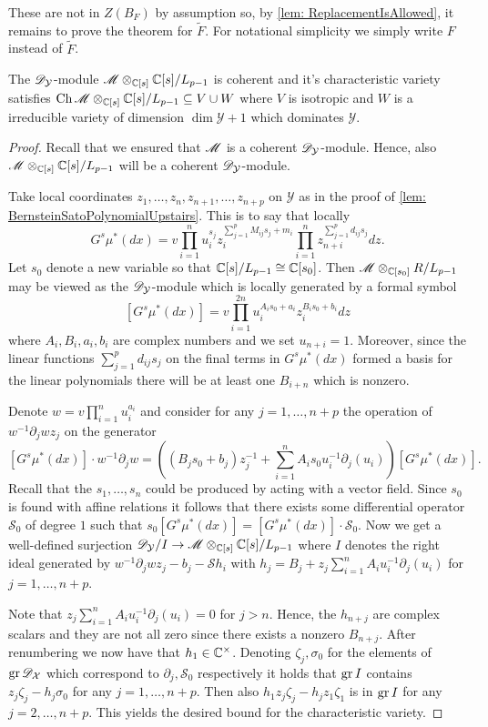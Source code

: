 These are not in $Z(B_F)$ by assumption so, by \cref{lem: ReplacementIsAllowed}, it remains to prove the theorem for $\widetilde{F}$.
For notational simplicity we simply write $F$ instead of $\widetilde{F}$.
\begin{lemma}\label{lem: CharVarEstimateW}
  The $\mathscr{D}_\mathcal{Y}$-module $\mathscr{M}\otimes_{\mathbb{C}[s]}\mathbb{C}[s]/L_{p-1}$ is coherent and it's characteristic variety satisfies $\operatorname{Ch}\mathscr{M}\otimes_{\mathbb{C}[s]}\mathbb{C}[s]/L_{p-1} \subseteq V \cup W $ where $V$ is isotropic and $W$ is a irreducible variety of dimension $\dim \mathcal{Y} +1$ which dominates $\mathcal{Y}$.
\end{lemma}
\begin{proof}
  Recall that we ensured that $\mathscr{M}$ is a coherent $\mathscr{D}_\mathcal{Y}$-module.
  Hence, also $\mathscr{M}\otimes_{\mathbb{C}[s]}\mathbb{C}[s]/L_{p-1}$ will be a coherent $\mathscr{D}_\mathcal{Y}$-module.

  Take local coordinates $z_1,\ldots,z_n,z_{n+1},\ldots,z_{n+p}$ on $\mathcal{Y}$ as in the proof of \cref{lem: BernsteinSatoPolynomialUpstairs}.
  This is to say that locally
  $$G^s \mu^*(dx) = v \prod_{i=1}^nu_i^{s_j}z_i^{\sum_{j=1}^p M_{ij}s_j + m_i}\prod_{i=1}^n z_{n+i}^{\sum_{j=1}^p d_{ij}s_j} dz.$$
  Let $s_0$ denote a new variable so that $\mathbb{C}[s]/L_{p-1}\cong \mathbb{C}[s_0]$.
  Then $\mathscr{M}\otimes_{\mathbb{C}[s_0]}R/L_{p-1}$ may be viewed as the $\mathscr{D}_\mathcal{Y}$-module which is locally generated by a formal symbol
  $$[G^s \mu^*(dx)] =v \prod_{i=1}^{2n} u_i^{A_i s_0 + a_i}z_i^{B_i s_0 + b_i} dz $$
  where $A_i,B_i,a_i,b_i$ are complex numbers and we set $u_{n+i}=1$.
  Moreover, since the linear functions $\sum_{j=1}^p d_{ij}s_j$ on the final terms in $G^s\mu^*(dx)$ formed a basis for the linear polynomials there will be at least one $B_{i+n}$ which is nonzero.

  Denote $w = v\prod_{i=1}^n u_i^{a_i}$ and consider for any $j=1,\ldots,n+p$ the operation of $w^{-1}\partial_j wz_j$ on the generator
  $$[G^s \mu^*(dx)]\cdot w^{-1}\partial_j w =((B_j s_0 + b_j)z_j^{-1} + \sum_{i=1}^{n} A_i s_0 u_i^{-1}\partial_j(u_i) )[G^s \mu^*(dx)].$$
  Recall that the $s_1,\ldots,s_n$ could be produced by acting with a vector field.
  Since $s_0$ is found with affine relations it follows that there exists some differential operator $\mathcal{S}_0$ of degree $1$ such that $s_0 [G^s \mu^*(dx)] = [G^s \mu^*(dx)]\cdot \mathcal{S}_0$.
  Now we get a well-defined surjection $\mathscr{D}_\mathcal{Y}/I \to \mathscr{M}\otimes_{\mathbb{C}[s]}\mathbb{C}[s]/L_{p-1}$ where $I$ denotes the right ideal generated by $w^{-1}\partial_j wz_j - b_j - \mathcal{S} h_i$ with $h_j = B_j + z_j\sum_{i=1}^n A_iu_i^{-1}\partial_j(u_i)$ for $j=1,\ldots, n+p$.

  Note that $ z_j\sum_{i=1}^n A_iu_i^{-1}\partial_j(u_i) = 0$ for $j>n$.
  Hence, the $h_{n+j}$ are complex scalars and they are not all zero since there exists a nonzero $B_{n+j}$.
  After renumbering we now have that $h_1 \in \mathbb{C}^\times$.
  Denoting $\zeta_j, \sigma_0$ for the elements of $\operatorname{gr} \mathscr{D}_\mathcal{X}$ which correspond to $\partial_j, \mathcal{S}_0$ respectively it holds that $\operatorname{gr} I$ contains $z_j \zeta_j - h_j \sigma_0$ for any $j=1,\ldots, n+p$.
  Then also $h_1z_j \zeta_j - h_jz_1 \zeta_1$ is in $\operatorname{gr} I$ for any $j=2,\ldots, n+p$.
  This yields the desired bound for the characteristic variety.
\end{proof}
